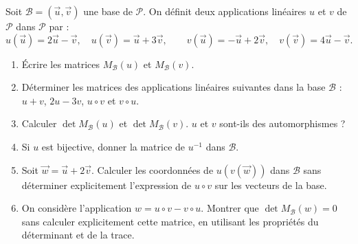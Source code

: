 \documentclass[11pt]{article}
\begin{document}
\begin{exercice}
Soit $\mathcal{B}=(\vec{u},\vec{v})$ une base de $\mathcal{P}$. On définit deux applications linéaires $u$ et $v$ de $\mathcal{P}$ dans $\mathcal{P}$ par :
\[
u(\vec{u}) = 2\vec{u} - \vec{v},\quad u(\vec{v}) = \vec{u} + 3\vec{v},\qquad
v(\vec{u}) = -\vec{u} + 2\vec{v},\quad v(\vec{v}) = 4\vec{u} - \vec{v}.
\]
\begin{enumerate}
    \item Écrire les matrices $M_{\mathcal{B}}(u)$ et $M_{\mathcal{B}}(v)$.
    \item Déterminer les matrices des applications linéaires suivantes dans la base $\mathcal{B}$ :
    $u+v$, $2u-3v$, $u \circ v$ et $v \circ u$.
    \item Calculer $\det M_{\mathcal{B}}(u)$ et $\det M_{\mathcal{B}}(v)$. $u$ et $v$ sont-ils des automorphismes ?
    \item Si $u$ est bijective, donner la matrice de $u^{-1}$ dans $\mathcal{B}$.
    \item Soit $\vec{w} = \vec{u} + 2\vec{v}$. Calculer les coordonnées de $u(v(\vec{w}))$ dans $\mathcal{B}$ sans déterminer explicitement l'expression de $u \circ v$ sur les vecteurs de la base.
    \item On considère l'application $w = u \circ v - v \circ u$. Montrer que $\det M_{\mathcal{B}}(w) = 0$ sans calculer explicitement cette matrice, en utilisant les propriétés du déterminant et de la trace.
\end{enumerate}
\end{exercice}
\end{document}
